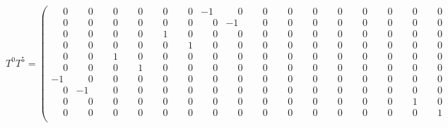 \documentclass[10pt]{article}
\begin{document}
\[
T^{0}T^{5} = \left(\begin{smallmatrix}
\phantom{-}0 & \phantom{-}0 & \phantom{-}0 & \phantom{-}0 & \phantom{-}0 & \phantom{-}0 & -1 & \phantom{-}0 & \phantom{-}0 & \phantom{-}0 & \phantom{-}0 & \phantom{-}0 & \phantom{-}0 & \phantom{-}0 & \phantom{-}0 & \phantom{-}0 \\
\phantom{-}0 & \phantom{-}0 & \phantom{-}0 & \phantom{-}0 & \phantom{-}0 & \phantom{-}0 & \phantom{-}0 & -1 & \phantom{-}0 & \phantom{-}0 & \phantom{-}0 & \phantom{-}0 & \phantom{-}0 & \phantom{-}0 & \phantom{-}0 & \phantom{-}0 \\
\phantom{-}0 & \phantom{-}0 & \phantom{-}0 & \phantom{-}0 & \phantom{-}1 & \phantom{-}0 & \phantom{-}0 & \phantom{-}0 & \phantom{-}0 & \phantom{-}0 & \phantom{-}0 & \phantom{-}0 & \phantom{-}0 & \phantom{-}0 & \phantom{-}0 & \phantom{-}0 \\
\phantom{-}0 & \phantom{-}0 & \phantom{-}0 & \phantom{-}0 & \phantom{-}0 & \phantom{-}1 & \phantom{-}0 & \phantom{-}0 & \phantom{-}0 & \phantom{-}0 & \phantom{-}0 & \phantom{-}0 & \phantom{-}0 & \phantom{-}0 & \phantom{-}0 & \phantom{-}0 \\
\phantom{-}0 & \phantom{-}0 & \phantom{-}1 & \phantom{-}0 & \phantom{-}0 & \phantom{-}0 & \phantom{-}0 & \phantom{-}0 & \phantom{-}0 & \phantom{-}0 & \phantom{-}0 & \phantom{-}0 & \phantom{-}0 & \phantom{-}0 & \phantom{-}0 & \phantom{-}0 \\
\phantom{-}0 & \phantom{-}0 & \phantom{-}0 & \phantom{-}1 & \phantom{-}0 & \phantom{-}0 & \phantom{-}0 & \phantom{-}0 & \phantom{-}0 & \phantom{-}0 & \phantom{-}0 & \phantom{-}0 & \phantom{-}0 & \phantom{-}0 & \phantom{-}0 & \phantom{-}0 \\
-1 & \phantom{-}0 & \phantom{-}0 & \phantom{-}0 & \phantom{-}0 & \phantom{-}0 & \phantom{-}0 & \phantom{-}0 & \phantom{-}0 & \phantom{-}0 & \phantom{-}0 & \phantom{-}0 & \phantom{-}0 & \phantom{-}0 & \phantom{-}0 & \phantom{-}0 \\
\phantom{-}0 & -1 & \phantom{-}0 & \phantom{-}0 & \phantom{-}0 & \phantom{-}0 & \phantom{-}0 & \phantom{-}0 & \phantom{-}0 & \phantom{-}0 & \phantom{-}0 & \phantom{-}0 & \phantom{-}0 & \phantom{-}0 & \phantom{-}0 & \phantom{-}0 \\
\phantom{-}0 & \phantom{-}0 & \phantom{-}0 & \phantom{-}0 & \phantom{-}0 & \phantom{-}0 & \phantom{-}0 & \phantom{-}0 & \phantom{-}0 & \phantom{-}0 & \phantom{-}0 & \phantom{-}0 & \phantom{-}0 & \phantom{-}0 & \phantom{-}1 & \phantom{-}0 \\
\phantom{-}0 & \phantom{-}0 & \phantom{-}0 & \phantom{-}0 & \phantom{-}0 & \phantom{-}0 & \phantom{-}0 & \phantom{-}0 & \phantom{-}0 & \phantom{-}0 & \phantom{-}0 & \phantom{-}0 & \phantom{-}0 & \phantom{-}0 & \phantom{-}0 & \phantom{-}1 \\

\end{smallmatrix}\]
\end{document}
